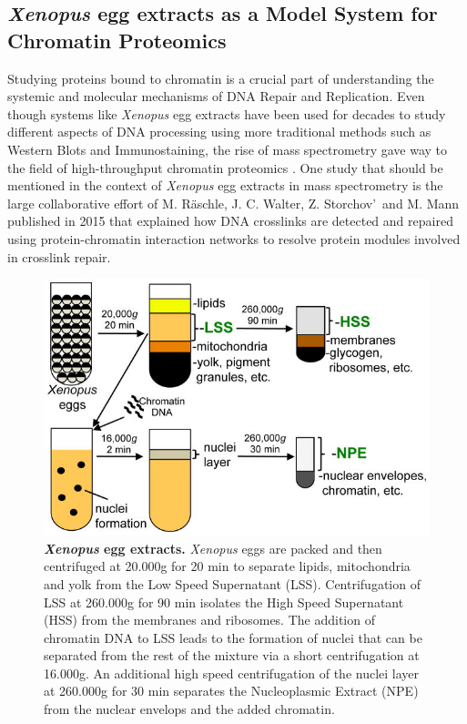 \subsection{\textit{Xenopus} egg extracts as a Model System for Chromatin Proteomics}
\label{sec:extracts}
Studying proteins bound to chromatin is a crucial part of understanding the systemic and molecular mechanisms of DNA Repair and Replication. Even though systems like \textit{Xenopus} egg extracts have been used for decades to study different aspects of DNA processing using more traditional methods such as Western Blots and Immunostaining, the rise of mass spectrometry gave way to the field of high-throughput chromatin proteomics \citep{Blow.1990,Cupello.2016,Bonisch.2008}. One study that should be mentioned in the context of \textit{Xenopus} egg extracts in mass spectrometry is the large collaborative effort of M. Räschle, J. C. Walter, Z. Storchov\a'\ and M. Mann published in 2015 \citep{Raschle.2015} that explained how DNA crosslinks are detected and repaired using protein-chromatin interaction networks to resolve protein modules involved in crosslink repair.
\begin{figure}[H]
    \centering
    \includegraphics[width=.78\textwidth]{resources/images/Intro/extracts.jpg}
    \caption[\textit{Xenopus} egg extracts]{\textbf{\textit{Xenopus} egg extracts.} \textit{Xenopus} eggs are packed and then centrifuged at 20.000g for 20 min to separate lipids, mitochondria and yolk from the Low Speed Supernatant (LSS). Centrifugation of LSS at 260.000g for 90 min isolates the High Speed Supernatant (HSS) from the membranes and ribosomes. The addition of chromatin DNA to LSS leads to the formation of nuclei that can be separated from the rest of the mixture via a short centrifugation at 16.000g. An additional high speed centrifugation of the nuclei layer at 260.000g for 30 min separates the Nucleoplasmic Extract (NPE) from the nuclear envelops and the added chromatin.\\\citep{Cupello.2016}}
    \label{fig:extracts}
\end{figure}
